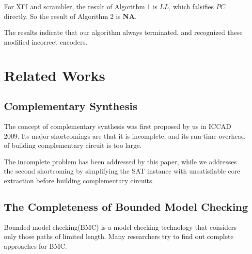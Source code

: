 \documentclass[journal]{IEEEtran}
\begin{document}
For XFI and scrambler,
the result of Algorithm 1 is $LL$,
which falsifies $PC$ directly.
So the result of Algorithm 2 is \textbf{NA}.

The results indicate that our algorithm always terminated,
and recognized these modified incorrect encoders.


%
%
%
%


\section{Related Works}\label{sec_relwork}
\subsection{Complementary Synthesis}

The concept of complementary synthesis was first proposed by us\cite{ShengYuShen:iccad09} in ICCAD 2009.
Its major shortcomings are that it is incomplete,
and its run-time overhead of building complementary circuit is too large.

The incomplete problem has been addressed by this paper, while we\cite{ShengYuShen:tcad} addresses the second shortcoming by simplifying the SAT instance with unsatisfiable core extraction before building complementary circuits.

\subsection{The Completeness of Bounded Model Checking}
Bounded model checking(BMC) is a model checking technology that considers only those paths of limited length.
Many researchers try to find out complete approaches for BMC.
\end{document}
